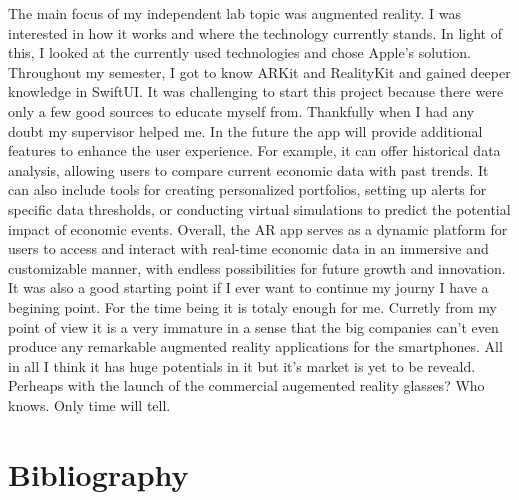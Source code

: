 \documentclass[a4paper,oneside]{article}
\begin{document}
The main focus of my independent lab topic was augmented reality. I was interested in how it works and where the technology currently stands.
In light of this, I looked at the currently used technologies and chose Apple's solution.
Throughout my semester, I got to know ARKit and RealityKit and gained deeper knowledge in SwiftUI.
\newblock
It was challenging to start this project because there were only a few good sources to educate myself from. Thankfully when I had any doubt my supervisor helped me.
In the future the app will provide additional features to enhance the user experience.
For example, it can offer historical data analysis, allowing users to compare current economic data with past trends. It can also include tools for creating personalized portfolios, setting up alerts for specific data thresholds, or conducting virtual simulations to predict the potential impact of economic events.
Overall, the AR app serves as a dynamic platform for users to access and interact with real-time economic data in an immersive and customizable manner, with endless possibilities for future growth and innovation.
It was also a good starting point if I ever want to continue my journy I have a begining point. For the time being it is totaly enough for me.
Curretly from my point of view it is a very immature in a sense that the big companies can't even produce any remarkable augmented reality applications for the smartphones. All in all I think it has huge potentials in it but it's market is yet to be reveald. Perheaps with the launch of the commercial augemented reality glasses? Who knows. Only time will tell.
\newpage

\section{Bibliography}
\label{sec:irod-es-csatl}
\end{document}
